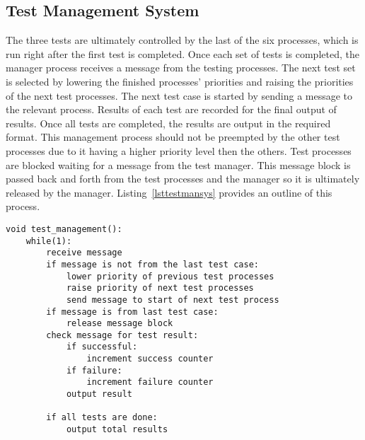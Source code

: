 \documentclass[oneside]{article}
\begin{document}
\subsection*{Test Management System}
The three tests are ultimately controlled by the last of the six
processes, which is run right after the first test is completed. Once
each set of tests is completed, the manager process receives a message
from the testing processes.  The next test set is selected by lowering
the finished processes' priorities and raising the priorities of the
next test processes. The next test case is started by sending a
message to the relevant process. Results of each test are recorded for
the final output of results. Once all tests are completed, the results
are output in the required format. This management process should
not be preempted by the other test processes due to it having a higher
priority level then the others. Test processes are blocked waiting for
a message from the test manager. This message block is passed back and
forth from the test processes and the manager so it is ultimately
released by the manager.  Listing~\ref{lsttestmansys} provides an
outline of this process.

\begin{lstlisting}
void test_management():
    while(1):
        receive message
        if message is not from the last test case:
            lower priority of previous test processes
            raise priority of next test processes
            send message to start of next test process
        if message is from last test case:
            release message block
        check message for test result:
            if successful:
                increment success counter
            if failure:
                increment failure counter
            output result
        
        if all tests are done:
            output total results
\end{lstlisting}
\end{document}
